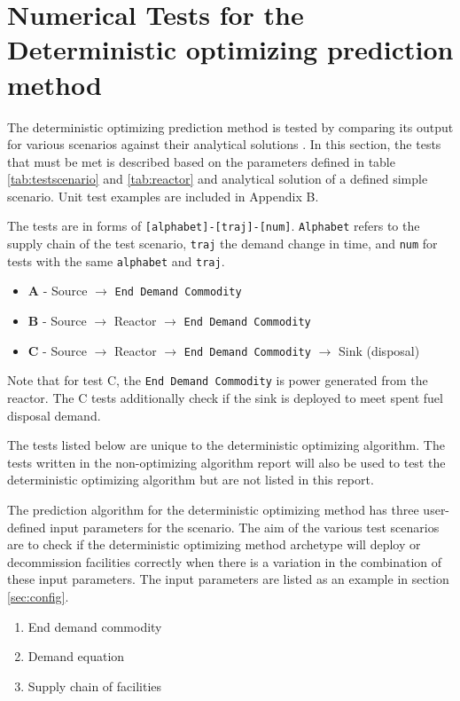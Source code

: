 \documentclass[11pt,letterpaper]{article}
\begin{document}
\pagebreak

\section{Numerical Tests for the Deterministic optimizing prediction method}
The deterministic optimizing prediction method is tested by comparing its output for various scenarios against their analytical solutions . In this section, the tests that must be met is described based on the parameters defined in table \ref{tab:testscenario} and \ref{tab:reactor} and analytical solution of a defined simple scenario. Unit test examples are included in Appendix B.

The tests are in forms of \texttt{[alphabet]-[traj]-[num]}. \texttt{Alphabet} refers to the supply chain of the test scenario,
\texttt{traj} the demand change in time, and \texttt{num} for tests with the same \texttt{alphabet} and \texttt{traj}.
\begin{itemize}
	\item \textbf{A} - Source $\rightarrow$ \texttt{End Demand Commodity}
	\item \textbf{B} - Source $\rightarrow$ Reactor $\rightarrow$ \texttt{End Demand Commodity}
	\item \textbf{C} - Source $\rightarrow$ Reactor $\rightarrow$ \texttt{End Demand Commodity} $\rightarrow$ Sink (disposal) 
\end{itemize}

Note that for test C, the \texttt{End Demand Commodity} is power generated from the reactor. The C tests additionally
check if the sink is deployed to meet spent fuel disposal demand.

The tests listed below are unique to the deterministic optimizing algorithm. The tests written in the non-optimizing algorithm report will also be used to test the deterministic optimizing algorithm but are not listed in this report.

The prediction algorithm for the deterministic optimizing method has three user-defined input parameters for the scenario.
The aim of the various test scenarios are to check if the
deterministic optimizing method archetype will deploy or decommission facilities correctly when there is a variation
in the combination of these input parameters. The input parameters are listed as an example in section \ref{sec:config}.

\begin{enumerate}
	\item End demand commodity
	\item Demand equation 
	\item Supply chain of facilities
\end{enumerate}
\end{document}
